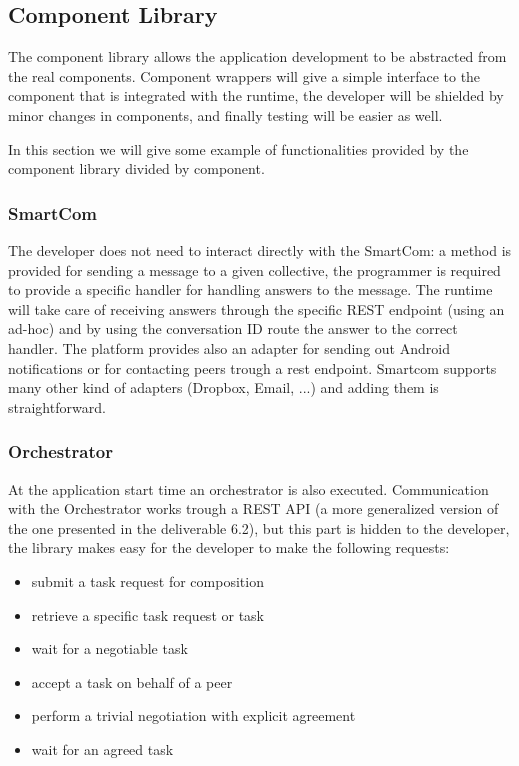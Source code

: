 \subsection{Component Library}
The component library allows the application development to be abstracted from the real components.
Component wrappers will give a simple interface to the component that is integrated with the runtime, the developer will be shielded by minor changes in components, and finally testing will be easier as well.

In this section we will give some example of functionalities provided by the component library divided by component.
\subsubsection{SmartCom}
The developer does not need to interact directly with the SmartCom: 
a method is provided for sending a message to a given collective, the programmer is required to provide a specific handler for handling answers to the message. The runtime will take care of receiving answers through the specific REST endpoint (using an ad-hoc) and by using the conversation ID route the answer to the correct handler. The platform provides also an adapter for sending out Android notifications or for contacting peers trough a rest endpoint. Smartcom supports many other kind of adapters (Dropbox, Email, ...) and adding them is straightforward.

\subsubsection{Orchestrator}
At the application start time an orchestrator is also executed. Communication with the Orchestrator works trough a REST API (a more generalized version of the one presented in the deliverable 6.2), but this part is hidden to the developer, the library makes easy for the developer to make the following requests:
\begin{itemize}
	\item submit a task request for composition
	\item retrieve a specific task request or task
	\item wait for a negotiable task
	\item accept a task on behalf of a peer
	\item perform a trivial negotiation with explicit agreement 
	\item wait for an agreed task
\end{itemize}

